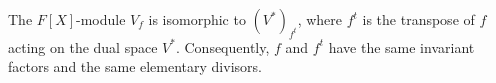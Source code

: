 The $F[X]$-module $V_f$ is isomorphic to $(V^*)_{f^t}$, where $f^t$ is the transpose of $f$ acting on the dual space $V^*$. Consequently, $f$ and $f^t$ have the same invariant factors and the same elementary divisors.
